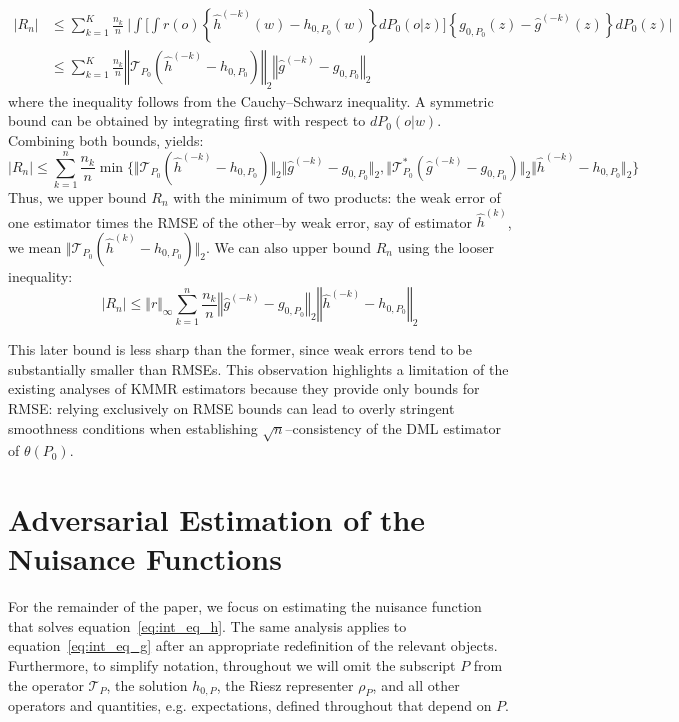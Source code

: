 \documentclass[twoside,11pt]{article}
\newcommand{\mc}{\mathcal}
\begin{document}
    \begin{align*}
  \vert R_n\vert &\le \sum_{k=1}^K\frac{n_k}{n} \: 
   \Bigg| \int \Bigg[ \int r(o)\left\{\hat h^{(-k)}(w)-h_{0,P_0}(w)\right\}dP_0(o|z)\Bigg]\left\{g_{0,P_0}(z)-\hat g^{(-k)}(z)\right\}dP_0(z) \Bigg|
  \\
  & \le \sum_{k=1}^K\frac{n_k}{n} \left\Vert \mc{T}_{P_0} (\hat h^{(-k)} -h_{0,P_0}) \right\Vert_2 \left\Vert \hat g^{(-k)} -g_{0,P_0} \right\Vert_2
\end{align*}
where the inequality follows from the Cauchy–Schwarz inequality. A symmetric bound can be obtained by integrating first with respect to $dP_0(o|w)$. Combining both bounds, yields:
\[
\vert R_n \vert  \le \sum_{k=1}^n \frac{n_k}{n}\min\{\Vert \mc{T}_{P_0} (\hat h^{(-k)} -h_{0,P_0}) \Vert_2\Vert \hat g^{(-k)} -g_{0,P_0} \Vert_2, \Vert \mc{T}^*_{P_0} (\hat g^{(-k)} -g_{0,P_0})\Vert_2\Vert \hat h^{(-k)} -h_{0,P_0}\Vert_2\}
\] 
Thus, we upper bound $R_n$ with the minimum of two products: the weak error of one estimator times the RMSE of the other--by weak error, say of estimator $\hat{h}^{(k)}$, we mean $\Vert \mc{T}_{P_0}(\hat{h}^{(k)}-h_{0,P_0})\Vert_2$. We can also upper bound $R_n$ using the looser inequality:
\[
\vert R_n \vert \le \Vert r \Vert_\infty\sum_{k=1}^n \frac{n_k}{n} \left\Vert \hat g^{(-k)} -g_{0,P_0}\right \Vert_2 \left\Vert \hat h^{(-k)} -h_{0,P_0}\right\Vert_2
\]

This later bound is less sharp than the former, since weak errors tend to be substantially smaller than RMSEs. This observation highlights a limitation of the existing analyses of KMMR estimators because they provide only bounds for RMSE: relying exclusively on RMSE bounds can lead to overly stringent smoothness conditions when establishing $\sqrt{n}$--consistency of the DML estimator of $\theta(P_0)$. 




\section{Adversarial Estimation of the Nuisance Functions}\label{sec:estimation_nuisance_fns}

For the remainder of the paper, we focus on estimating the nuisance function that solves equation~\eqref{eq:int_eq_h}. The same analysis applies to equation~\eqref{eq:int_eq_g} after an appropriate redefinition of the relevant objects. Furthermore, to simplify notation, throughout we will omit the subscript $P$ from the operator $\mc{T}_{P}$, the solution $h_{0,P}$, the Riesz representer $\rho_P$, and all other operators and quantities, e.g. expectations, defined throughout that depend on $P$.
\end{document}
